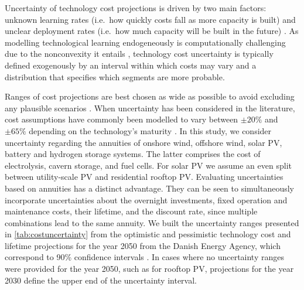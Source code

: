 

Uncertainty of technology cost projections is driven by two main factors:
unknown learning rates (i.e.~how quickly costs fall as more capacity is built) and
unclear deployment rates (i.e.~how much capacity will be built in the future) \cite{gritsevskyi_modeling_2000,yeh_review_2012}.
As modelling technological learning endogeneously is computationally challenging due to the nonconvexity it entails \cite{heuberger_power_2017,mattsson_learning_2019,lisa_learning2022},
technology cost uncertainty is typically defined exogenously by an interval within which costs may vary
and a distribution that specifies which segments are more probable.


Ranges of cost projections are best chosen as wide as possible to avoid
excluding any plausible scenarios
\cite{moret_characterization_2017,mccollum_energy_2020}. When uncertainty has
been considered in the literature, cost assumptions have commonly been modelled
to vary between $\pm20\%$ and $\pm65\%$ depending on the technology's maturity
\cite{moret_characterization_2017,shirizadeh_how_2019,pizarro-alonso_uncertainties_2019,li_using_2020,trondle_trade-offs_2020}.
In this study, we consider uncertainty regarding the annuities of onshore wind,
offshore wind, solar PV, battery and hydrogen storage systems. The latter
comprises the cost of electrolysis, cavern storage, and fuel cells. For solar PV
we assume an even split between utility-scale PV and residential rooftop PV.
Evaluating uncertainties based on annuities has a distinct advantage. They can
be seen to simultaneously incorporate uncertainties about the overnight
investments, fixed operation and maintenance costs, their lifetime, and the
discount rate, since multiple combinations lead to the same annuity. We built
the uncertainty ranges presented in \cref{tab:costuncertainty} from the
optimistic and pessimistic technology cost and lifetime projections for the year
2050 from the Danish Energy Agency, which correspond to 90\% confidence
intervals \cite{DEA}. In cases where no uncertainty ranges were provided
for the year 2050, such as for rooftop PV, projections for the year 2030
define the upper end of the uncertainty interval.

